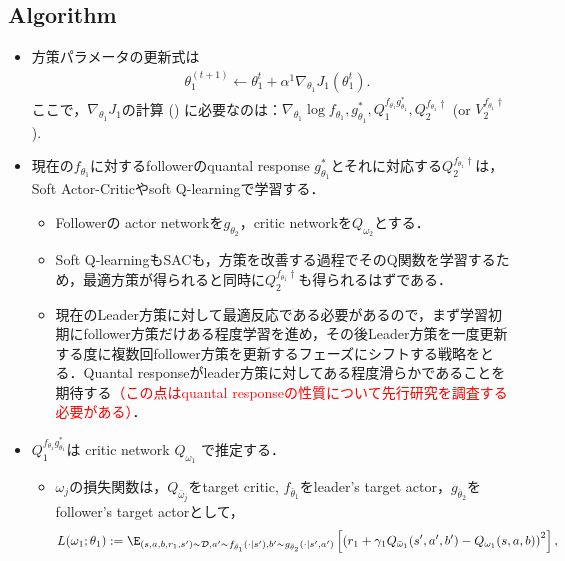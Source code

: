 \documentclass[a4paper,10pt,dvipdfmx]{jsarticle}
\begin{document}
\subsection{Algorithm}

\begin{itemize}
    \item 方策パラメータの更新式は
    \begin{align}
        &\theta_1^{(t+1)}\gets \theta_1^t+\alpha^1\nabla_{\theta_1} J_1(\theta_1^t).
    \end{align}
    ここで，$\nabla_{\theta_1}J_1$の計算 () に必要なのは：$\nabla_{\theta_1}\log f_{\theta_1}, g_{\theta_1}^*, Q_1^{f_{\theta_1}g_{\theta_1}^*}, Q_2^{f_{\theta_1}\dag}$ (or $V_2^{f_{\theta_1}\dag}$).
    \item 現在の$f_{\theta_1}$に対するfollowerのquantal response $g_{\theta_1}^*$とそれに対応する$Q_2^{f_{\theta_1}\dag}$は，Soft Actor-Criticやsoft Q-learningで学習する．
    \begin{itemize}
        \item Followerの actor networkを$g_{\theta_2}$，critic networkを$Q_{\omega_2}$とする．
        \item Soft Q-learning\cite{Haarnoja2017-nn}もSAC\cite{Haarnoja2018-if}も，方策を改善する過程でそのQ関数を学習するため，最適方策が得られると同時に$Q_2^{f_{\theta_1}\dag}$も得られるはずである．
        \item 現在のLeader方策に対して最適反応である必要があるので，まず学習初期にfollower方策だけある程度学習を進め，その後Leader方策を一度更新する度に複数回follower方策を更新するフェーズにシフトする戦略をとる．Quantal responseがleader方策に対してある程度滑らかであることを期待する\textcolor{red}{（この点はquantal responseの性質について先行研究を調査する必要がある）}．
    \end{itemize}
    \item $Q_1^{f_{\theta_1}g_{\theta_1}^*}$は
    critic network $Q_{\omega_1}$ で推定する．
    \begin{itemize}
        \item $\omega_j$の損失関数は，$Q_{\bar{\omega}_j}$をtarget critic, $f_{\bar{\theta}_1}$をleader's target actor，$g_{\bar{\theta}_2}$をfollower's target actorとして，
        \begin{align}
            &L(\omega_1;\theta_1):=\E_{(s,a,b,r_1,s')\sim\mathcal{D},a'\sim f_{\bar{\theta}_1}(\cdot|s'),b'\sim g_{\bar{\theta}_2}(\cdot|s',a')}\left[\left(r_1+\gamma_1Q_{\bar{\omega}_1}(s',a',b') - Q_{\omega_1}(s,a,b)\right)^2\right],\\

\end{align}
\end{itemize}
\end{itemize}
\end{document}
